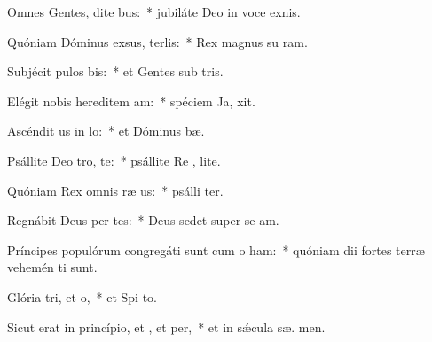 \item Omnes Gentes, dite bus:~* jubiláte Deo in voce exnis.
\item Quóniam Dóminus exsus, terlis:~* Rex magnus su  ram.
\item Subjécit pulos bis:~* et Gentes sub  tris.
\item Elégit nobis hereditem am:~* spéciem Ja,  xit.
\item Ascéndit us in lo:~* et Dóminus   bæ.
\item Psállite Deo tro, te:~* psállite Re , lite.
\item Quóniam Rex omnis ræ us:~* psálli ter.
\item Regnábit Deus per tes:~* Deus sedet super se  am.
\item Príncipes populórum congregáti sunt cum o ham:~* quóniam dii fortes terræ vehemén ti sunt.
\item Glória tri, et o,~* et Spi to.
\item Sicut erat in princípio, et , et per,~* et in sǽcula sæ. men.
